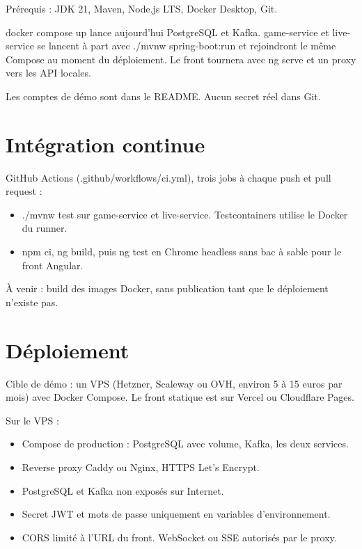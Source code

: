 \documentclass[11pt,a4paper]{article}
\newcommand{\field}[1]{{\ttfamily #1}}
\begin{document}
Prérequis : JDK 21, Maven, Node.js LTS, Docker Desktop, Git.

\field{docker compose up} lance aujourd'hui PostgreSQL et Kafka. \field{game-service} et \field{live-service} se lancent à part avec \field{./mvnw spring-boot:run} et rejoindront le même Compose au moment du déploiement. Le front tournera avec \field{ng serve} et un proxy vers les API locales.

Les comptes de démo sont dans le README. Aucun secret réel dans Git.

\section{Intégration continue}

GitHub Actions (\field{.github/workflows/ci.yml}), trois jobs à chaque push et pull request :

\begin{itemize}
  \item \field{./mvnw test} sur \field{game-service} et \field{live-service}. Testcontainers utilise le Docker du runner.
  \item \field{npm ci}, \field{ng build}, puis \field{ng test} en Chrome headless sans bac à sable pour le front Angular.
\end{itemize}

À venir : build des images Docker, sans publication tant que le déploiement n'existe pas.

\section{Déploiement}

Cible de démo : un VPS (Hetzner, Scaleway ou OVH, environ 5 à 15 euros par mois) avec Docker Compose. Le front statique est sur Vercel ou Cloudflare Pages.

Sur le VPS :

\begin{itemize}
  \item Compose de production : PostgreSQL avec volume, Kafka, les deux services.
  \item Reverse proxy Caddy ou Nginx, HTTPS Let's Encrypt.
  \item PostgreSQL et Kafka non exposés sur Internet.
  \item Secret JWT et mots de passe uniquement en variables d'environnement.
  \item CORS limité à l'URL du front. WebSocket ou SSE autorisés par le proxy.
\end{itemize}
\end{document}
